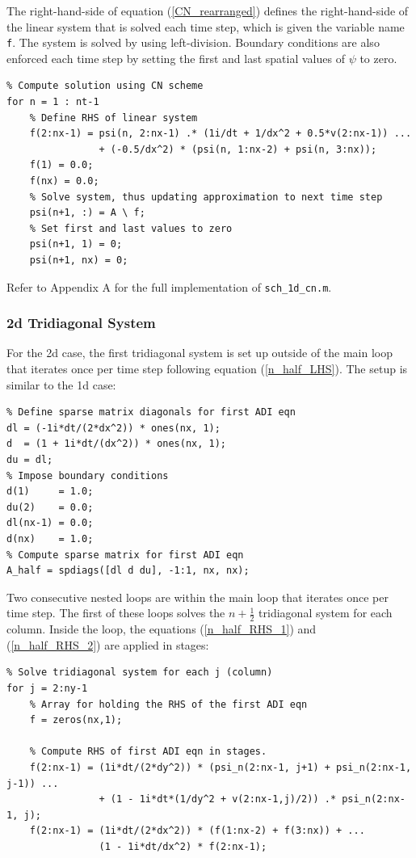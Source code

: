 \documentclass[10pt]{article}
\def\code#1{\texttt{#1}} %
\begin{document}
The right-hand-side of equation (\ref{CN_rearranged}) defines the right-hand-side of the linear 
system that is solved each time step, which is given the variable name \code{f}. The system is solved
by using left-division. Boundary conditions are also enforced each time step by setting the first and
last spatial values of $\psi$ to zero.
\begin{verbatim}
% Compute solution using CN scheme
for n = 1 : nt-1
    % Define RHS of linear system
    f(2:nx-1) = psi(n, 2:nx-1) .* (1i/dt + 1/dx^2 + 0.5*v(2:nx-1)) ...
                + (-0.5/dx^2) * (psi(n, 1:nx-2) + psi(n, 3:nx));
    f(1) = 0.0;
    f(nx) = 0.0;
    % Solve system, thus updating approximation to next time step
    psi(n+1, :) = A \ f;
    % Set first and last values to zero
    psi(n+1, 1) = 0; 
    psi(n+1, nx) = 0; 
\end{verbatim}

Refer to Appendix A for the full implementation of \code{sch\_1d\_cn.m}.

\subsubsection*{2d Tridiagonal System}

For the 2d case, the first tridiagonal system is set up outside of the main loop that iterates once 
per time step following equation (\ref{n_half_LHS}). The setup is similar to the 1d case:
\begin{verbatim}
% Define sparse matrix diagonals for first ADI eqn
dl = (-1i*dt/(2*dx^2)) * ones(nx, 1);
d  = (1 + 1i*dt/(dx^2)) * ones(nx, 1);
du = dl;
% Impose boundary conditions
d(1)     = 1.0;
du(2)    = 0.0;
dl(nx-1) = 0.0;
d(nx)    = 1.0;
% Compute sparse matrix for first ADI eqn
A_half = spdiags([dl d du], -1:1, nx, nx);
\end{verbatim}

Two consecutive nested loops are within the main loop that iterates once per time step. The first 
of these loops solves the $n+\frac{1}{2}$ tridiagonal system for each column. Inside the loop, 
the equations (\ref{n_half_RHS_1}) and (\ref{n_half_RHS_2}) are applied in stages: 
\begin{verbatim}
% Solve tridiagonal system for each j (column)
for j = 2:ny-1
    % Array for holding the RHS of the first ADI eqn
    f = zeros(nx,1);

    % Compute RHS of first ADI eqn in stages. 
    f(2:nx-1) = (1i*dt/(2*dy^2)) * (psi_n(2:nx-1, j+1) + psi_n(2:nx-1, j-1)) ...
                + (1 - 1i*dt*(1/dy^2 + v(2:nx-1,j)/2)) .* psi_n(2:nx-1, j);
    f(2:nx-1) = (1i*dt/(2*dx^2)) * (f(1:nx-2) + f(3:nx)) + ...
                (1 - 1i*dt/dx^2) * f(2:nx-1);
\end{verbatim}
\end{document}
